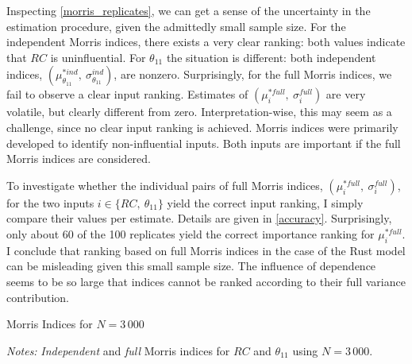 Inspecting \cref{morris_replicates}, we can get a sense of the uncertainty in the estimation procedure,
given the admittedly small sample size. For the independent Morris indices, there exists a
very clear ranking: both values indicate that $RC$ is uninfluential. For $\theta_{11}$ the situation is
different: both independent indices, $(\mu^{\ast ind}_{\theta_{11}},\ \sigma_{\theta_{11}}^{ind})$, are nonzero. Surprisingly, for the full Morris indices,
we fail to observe a clear input ranking. Estimates of $(\mu^{\ast full}_i,\ \sigma_i^{full})$ are very volatile, but
clearly different from zero. Interpretation-wise, this may seem as a challenge, since no
clear input ranking is achieved. Morris indices were primarily developed to
identify non-influential inputs. Both inputs are important if the full Morris indices are
considered.

To investigate whether the individual pairs of full Morris indices, $(\mu^{\ast full}_i,\ \sigma_i^{full})$, for the
two inputs $i \in \{RC,\ \theta_{11}\}$ yield the correct input ranking, I simply compare their values
per estimate. Details are given in \cref{accuracy}. Surprisingly, only about 60 of the 100 replicates yield the correct importance ranking
for $\mu^{\ast full}_i$. I conclude that ranking based on full Morris indices in the case of the Rust model can be misleading given this small sample size.
The influence of dependence seems to be so large that indices cannot be ranked according to their full variance contribution.

\begin{table}[t]
    \centering
    \caption{Morris Indices for $N=3\,000$}
    \label{morris_3000}
    \begin{threeparttable}
    \begin{centering}
        
        \begin{tablenotes}
            \small
            \item \textit{Notes:} \textit{Independent} and \textit{full} Morris indices for $RC$ and $\theta_{11}$ using $N=3\,000$.
        \end{tablenotes}
    \end{centering}

    \end{threeparttable}

\end{table}

% 	

